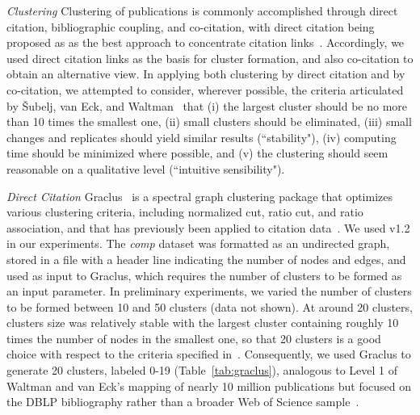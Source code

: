 \emph{Clustering} Clustering of publications is commonly accomplished through direct citation, bibliographic coupling, and co-citation, with direct citation being proposed as as the best approach to concentrate citation links~\cite{kessler_comparison_1965,klavans_which_2017}. Accordingly, we used direct citation links as the basis for cluster formation, and also co-citation to obtain an alternative view. In applying both clustering by direct citation and by co-citation, we attempted to consider, wherever possible, the criteria articulated by \v{S}ubelj, van Eck, and Waltman~\cite{subelj_clustering_2016} that (i) the largest cluster should be no more than 10 times the smallest one, (ii) small clusters should be eliminated, (iii) small changes and replicates should yield similar results (``stability"),  (iv) computing time should be minimized where possible, and (v) the clustering should seem reasonable on a qualitative level (``intuitive sensibility").

 \emph {Direct Citation} Graclus~\cite{graclus_2007} is a spectral graph clustering package that optimizes  various clustering criteria, including normalized cut, ratio cut, and ratio association, and that has previously been applied to citation data~\cite{subelj_clustering_2016}. 
We used v1.2 in our experiments. The \emph{comp} dataset was formatted as an undirected graph, stored in a file with a header line indicating the number of nodes and edges, and used as input to Graclus, which requires the number of clusters to be formed as an input parameter. In preliminary experiments, we varied the number of clusters to be formed between 10 and 50 clusters (data not shown).  At around 20 clusters, clusters size was relatively stable with the largest cluster containing roughly 10 times the number of nodes in the smallest one,
so that 20 clusters is a good choice with respect to the criteria specified in~\cite{subelj_clustering_2016}. Consequently, we used Graclus to generate 20 clusters, labeled 0-19 (Table~\ref{tab:graclus}), analogous to Level 1 of Waltman and van Eck's mapping of nearly 10 million publications but focused on the DBLP bibliography rather than a broader Web of Science sample~\cite{waltman_new_2012}. 

